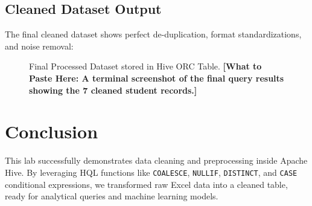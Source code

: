 \documentclass[11pt,a4paper]{article}
\begin{document}
\subsection{Cleaned Dataset Output}
The final cleaned dataset shows perfect de-duplication, format standardizations, and noise removal:

\begin{figure}[H]
\centering
{}
\caption{Final Processed Dataset stored in Hive ORC Table. \textbf{[What to Paste Here: A terminal screenshot of the final query results showing the 7 cleaned student records.]}}
\label{fig:finaldataset}
\end{figure}

\section{Conclusion}
This lab successfully demonstrates data cleaning and preprocessing inside Apache Hive. By leveraging HQL functions like \texttt{COALESCE}, \texttt{NULLIF}, \texttt{DISTINCT}, and \texttt{CASE} conditional expressions, we transformed raw Excel data into a cleaned table, ready for analytical queries and machine learning models.
\end{document}
